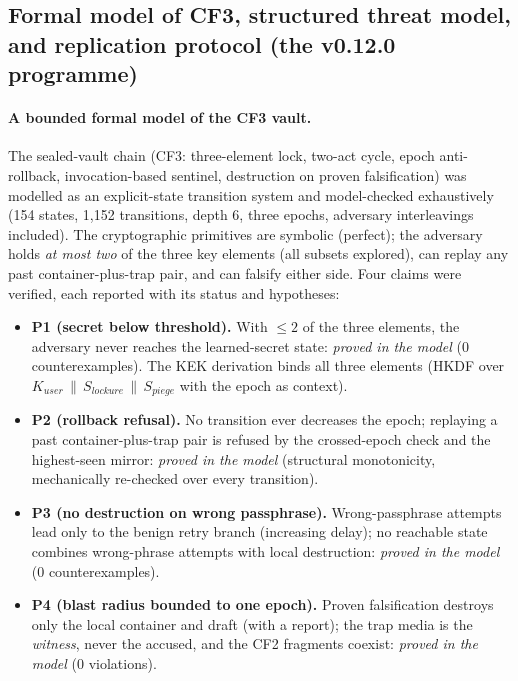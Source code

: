 \documentclass[10pt,a4paper]{article}
\begin{document}
\subsection{Formal model of CF3, structured threat model, and
replication protocol (the v0.12.0 programme)}\label{sec:formel}

\paragraph{A bounded formal model of the CF3 vault.} The sealed-vault
chain (CF3: three-element lock, two-act cycle, epoch anti-rollback,
invocation-based sentinel, destruction on proven falsification) was
modelled as an explicit-state transition system and model-checked
exhaustively (154 states, 1{,}152 transitions, depth 6, three epochs,
adversary interleavings included). The cryptographic primitives are
symbolic (perfect); the adversary holds \emph{at most two} of the three
key elements (all subsets explored), can replay any past
container-plus-trap pair, and can falsify either side. Four claims were
verified, each reported with its status and hypotheses:

\begin{itemize}
\item \textbf{P1 (secret below threshold).} With $\le 2$ of the three
elements, the adversary never reaches the learned-secret state:
\emph{proved in the model} (0 counterexamples). The KEK derivation
binds all three elements (HKDF over $K_{user}\,\|\,S_{lockure}\,\|\,
S_{piege}$ with the epoch as context).
\item \textbf{P2 (rollback refusal).} No transition ever decreases the
epoch; replaying a past container-plus-trap pair is refused by the
crossed-epoch check and the highest-seen mirror: \emph{proved in the
model} (structural monotonicity, mechanically re-checked over every
transition).
\item \textbf{P3 (no destruction on wrong passphrase).} Wrong-passphrase
attempts lead only to the benign retry branch (increasing delay); no
reachable state combines wrong-phrase attempts with local destruction:
\emph{proved in the model} (0 counterexamples).
\item \textbf{P4 (blast radius bounded to one epoch).} Proven
falsification destroys only the local container and draft (with a
report); the trap media is the \emph{witness}, never the accused, and
the CF2 fragments coexist: \emph{proved in the model} (0 violations).
\end{itemize}
\end{document}

